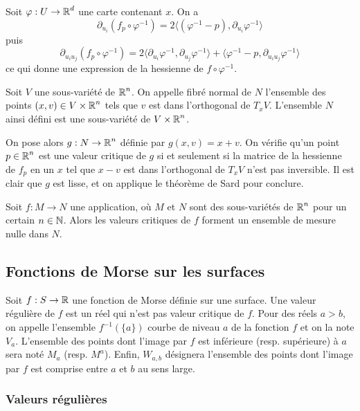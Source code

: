 Soit $\varphi:U\to \operatorname{\mathbb R}^d$ une carte contenant $x$. On a 
\[
    \partial_{u_i}(f_p\circ\varphi^{-1})=
    2\langle (\varphi^{-1}-p),\partial_{u_i}\varphi^{-1}\rangle
\]
puis
\[
    \partial_{u_iu_j}(f_p\circ\varphi^{-1})=
    2\langle\partial_{u_i}\varphi^{-1},\partial_{u_j}\varphi^{-1}\rangle
    +\langle\varphi^{-1}-p,\partial_{u_iu_j}\varphi^{-1}\rangle\tag*{(1)}
\]
ce qui donne une expression de la hessienne de $f\circ\varphi^{-1}$. 

\begin{defi}
    Soit $V$ une sous-variété de $\operatorname{\mathbb R}^n$. 
    On appelle fibré normal de $N$ l'ensemble des points $(x,v)\in V\times\operatorname{\mathbb R}^n$ tels que $v$ 
    est dans l'orthogonal de $T_xV$. 
    L'ensemble $N$ ainsi défini est une sous-variété de $V\times\operatorname{\mathbb R}^n$.
\end{defi}

On pose alors $g:N\to\operatorname{\mathbb R}^n$ définie par $g(x,v)=x+v$. 
On vérifie qu'un point $p\in\operatorname{\mathbb R}^n$ est une valeur critique de $g$ si et seulement si 
la matrice de la hessienne de $f_p$ en un $x$ tel que $x-v$ est dans l'orthogonal de 
$T_xV$ n'est pas inversible.
Il est clair que $g$ est lisse, et on applique le théorème de Sard pour conclure.

\begin{thm}[de Sard]
    Soit $f:M\to N$ une application, où $M$ et $N$ sont des sous-variétés de 
    $\operatorname{\mathbb R}^n$ pour un certain $n\in\operatorname{\mathbb N}$.
    Alors les valeurs critiques de $f$ forment un ensemble de mesure nulle dans $N$.
\end{thm}

\subsection{Fonctions de Morse sur les surfaces}

Soit $f:S\to\operatorname{\mathbb R}$ une fonction de Morse définie sur une surface. 
Une valeur régulière de $f$ est un réel qui n'est pas valeur critique de $f$. 
Pour des réels $a>b$, on appelle l'ensemble $f^{-1}(\lbrace a \rbrace)$ courbe de niveau 
$a$ de la fonction $f$ et on la note $V_a$. 
L'ensemble des points dont l'image par $f$ est inférieure (resp. supérieure) à $a$ sera noté $M_a$
(resp. $M^a$). 
Enfin, $W_{a,b}$ désignera l'ensemble des points dont l'image par $f$ est comprise entre 
$a$ et $b$ au sens large. 

\subsubsection{Valeurs régulières}

